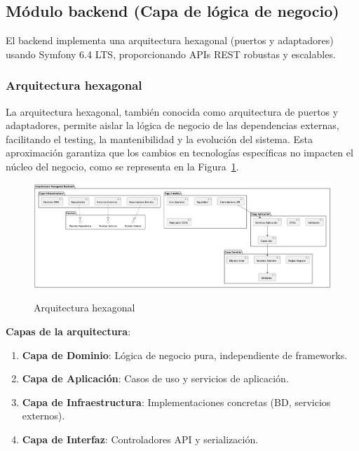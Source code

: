 \documentclass[12pt,a4paper,oneside]{report}
\providecommand{\tightlist}{%
  \setlength{\itemsep}{0pt}\setlength{\parskip}{0pt}}
\providecommand{\pandocbounded}[1]{#1}
\begin{document}
\subsection{Módulo backend (Capa de lógica de
negocio)}\label{muxf3dulo-backend-capa-de-luxf3gica-de-negocio}

El backend implementa una arquitectura hexagonal (puertos y adaptadores)
usando Symfony 6.4 LTS, proporcionando APIs REST robustas y escalables.

\subsubsection{Arquitectura hexagonal}\label{arquitectura-hexagonal}

La arquitectura hexagonal, también conocida como arquitectura de puertos y adaptadores, permite aislar la lógica de negocio de las dependencias externas, facilitando el testing, la mantenibilidad y la evolución del sistema. Esta aproximación garantiza que los cambios en tecnologías específicas no impacten el núcleo del negocio, como se representa en la Figura~\ref{fig:arquitectura-hexagonal}.

\begin{figure}[H]
\centering
\pandocbounded{\includegraphics[keepaspectratio,alt={Arquitectura hexagonal}]{processed/images/05_diseno_plantuml_1.png}}
\caption{Arquitectura hexagonal}
\label{fig:arquitectura-hexagonal}
\end{figure}

\textbf{Capas de la arquitectura}:

\begin{enumerate}
\def\labelenumi{\arabic{enumi}.}
\tightlist
\item
  \textbf{Capa de Dominio}: Lógica de negocio pura, independiente de
  frameworks.
\item
  \textbf{Capa de Aplicación}: Casos de uso y servicios de aplicación.
\item
  \textbf{Capa de Infraestructura}: Implementaciones concretas (BD,
  servicios externos).
\item
  \textbf{Capa de Interfaz}: Controladores API y serialización.
\end{enumerate}
\end{document}
